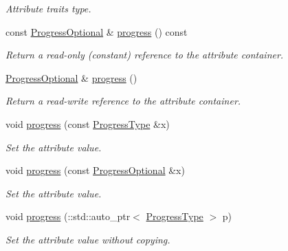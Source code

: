 \begin{DoxyCompactItemize}
\begin{DoxyCompactList}\small\item\em Attribute traits type. \item\end{DoxyCompactList}\item 
const \hyperlink{classopenstack_1_1xml_1_1Server_a88d757bf2e2217b7404fdb184c719e8e}{ProgressOptional} \& \hyperlink{classopenstack_1_1xml_1_1Server_ad9214d2b6e6455ecec0b5ac83346264a}{progress} () const 
\begin{DoxyCompactList}\small\item\em Return a read-\/only (constant) reference to the attribute container. \item\end{DoxyCompactList}\item 
\hyperlink{classopenstack_1_1xml_1_1Server_a88d757bf2e2217b7404fdb184c719e8e}{ProgressOptional} \& \hyperlink{classopenstack_1_1xml_1_1Server_aaecb7cb48e3a6af5c1ab162de1835996}{progress} ()
\begin{DoxyCompactList}\small\item\em Return a read-\/write reference to the attribute container. \item\end{DoxyCompactList}\item 
void \hyperlink{classopenstack_1_1xml_1_1Server_a31680bd3f5b7b07fecdb843581ca1626}{progress} (const \hyperlink{classopenstack_1_1xml_1_1Progress}{ProgressType} \&x)
\begin{DoxyCompactList}\small\item\em Set the attribute value. \item\end{DoxyCompactList}\item 
void \hyperlink{classopenstack_1_1xml_1_1Server_a1b07ffa058ed8fed3b51c2b4b2e428fe}{progress} (const \hyperlink{classopenstack_1_1xml_1_1Server_a88d757bf2e2217b7404fdb184c719e8e}{ProgressOptional} \&x)
\begin{DoxyCompactList}\small\item\em Set the attribute value. \item\end{DoxyCompactList}\item 
void \hyperlink{classopenstack_1_1xml_1_1Server_aeb95b8a63535cbb1e3ac3d72af45f541}{progress} (::std::auto\_\-ptr$<$ \hyperlink{classopenstack_1_1xml_1_1Progress}{ProgressType} $>$ p)
\begin{DoxyCompactList}\small\item\em Set the attribute value without copying. \item\end{DoxyCompactList}\end{DoxyCompactItemize}
